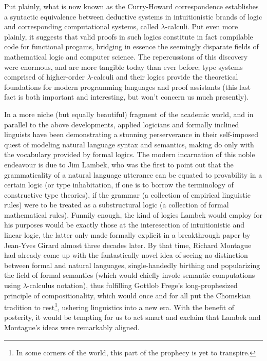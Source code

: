 Put plainly, what is now known as the Curry-Howard correspondence establishes a syntactic equivalence between deductive systems in intuitionistic brands of logic and corresponding computational systems, called $\lambda$-calculi.
Put even more plainly, it suggests that valid proofs in such logics constitute in fact compilable code for functional progams, bridging in essence the seemingly disparate fields of mathematical logic and computer science.
The repercussions of this discovery were enormous, and are more tangible today than ever before; type systems comprised of higher-order $\lambda$-calculi and their logics provide the theoretical foundations for modern programming languages and proof assistants (this last fact is both important and interesting, but won't concern us much presently).

In a more niche (but equally beautiful) fragment of the academic world, and in parallel to the above developments, applied logicians and formally inclined linguists have been demonstrating a stunning perserverance in their self-imposed quest of modeling natural language syntax and semantics, making do only with the vocabulary provided by formal logics.
The modern incarnation of this noble endeavour is due to Jim Lambek, who was the first to point out that the grammaticality of a natural language utterance can be equated to provability in a certain logic (or type inhabitation, if one is to borrow the terminology of constructive type theories), if the grammar (a collection of empirical linguistic rules) were to be treated as a substructural logic (a collection of formal mathematical rules).
Funnily enough, the kind of logics Lambek would employ for his purposes would be exactly those at the interesection of intuitionistic and linear logic, the latter only made formally explicit in a breakthrough paper by Jean-Yves Girard almost three decades later.
By that time, Richard Montague had already come up with the fantastically novel idea of seeing no distinction between formal and natural languages, single-handedly birthing and popularizing the field of formal semantics (which would chiefly invole semantic computations using $\lambda$-calculus notation), thus fulfilling Gottlob Frege's long-prophesized principle of compositionality, which would once and for all put the Chomskian tradition to rest\footnote{In some corners of the world, this part of the prophecy is yet to transpire.}, ushering linguistics into a new era.
With the benefit of posterity, it would be tempting for us to act smart and exclaim that Lambek and Montague's ideas were remarkably aligned. 
